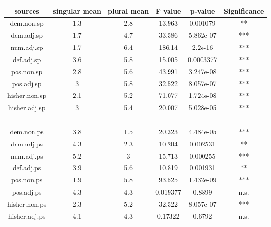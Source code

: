 \documentclass[
  11pt          %
  ,letterpaper  %
  ,center       %
  ,noupper      %
  ]{uconnthesis2}
\begin{document}
\vspace{-1em}
\begin{table}[htb!] \small \centering
\resizebox{0.8\textwidth}{!}
{
\begin{tabular}{ | c | c | c | c | c | c |} \hline 
sources			&	singular mean	&	plural mean 	& 	F value		&	p-value		&	Significance	\\ \hline
dem.non.sp		&	1.3			&	2.8		&	13.963		&	0.001079		&	**			\\ \hline
dem.adj.sp		&	1.7			&	4.7		&	33.586		&	5.862e-07		&	***			\\ \hline
num.adj.sp		&	1.7			&	6.4		&	186.14		&	2.2e-16		&	***			\\ \hline
def.adj.sp			&	3.6			&	5.8		&	15.005		&	0.0003377	&	***			\\ \hline
pos.non.sp		&	2.8			&	5.6		&	43.991		&	3.247e-08		&	***			\\ \hline
pos.adj.sp			&	3			&	5.8		&	32.522		&	8.057e-07		&	***			\\ \hline
hisher.non.sp		&	2.1 			&	5.2		&	71.077		&	1.724e-08		&	***			\\ \hline
hisher.adj.sp		&	3			&	5.4		&	20.007		&	5.028e-05		&	***			\\ \hline
~				&	~			&	~		&	~			&	~			&	~			\\ \hline
dem.non.ps		&	3.8			&	1.5		&	20.323		&	4.484e-05		&	***			\\ \hline
dem.adj.ps		&	4.3 			&	2.3		&	10.204		&	0.002531		&	**			\\ \hline
num.adj.ps		&	5.2			&	3		&	15.713		&	0.000255		&	***			\\ \hline
def.adj.ps			&	3.9			&	5.6		&	10.819		&	0.001931		&	**			\\ \hline
pos.non.ps		&	1.9			&	5.8		&	93.525		&	1.432e-09		&	***			\\ \hline
pos.adj.ps			&	4.3			&	4.3		&	0.019377		&	0.8899		&	n.s.			\\ \hline
hisher.non.ps		&	2.3			&	5.2		&	32.522		&	8.057e-07		&	***			\\ \hline
hisher.adj.ps		&	4.1			&	4.3		&	0.17322		&	0.6792		&	n.s.			\\ \hline


\end{tabular}}
\end{table}
\end{document}
